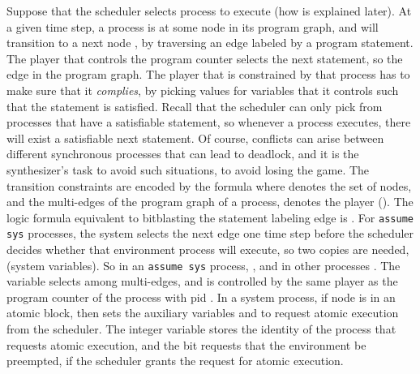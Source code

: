 \documentclass[copyright]{eptcs}
\begin{document}
Suppose that the scheduler selects process  to execute (how is explained later).
At a given time step, a process is at some node  in its program graph, and will transition to a next node , by traversing an edge labeled by a program statement.
The player that controls the program counter  selects the next statement, so the edge in the program graph.
The player that is constrained by that process has to make sure that it {\em complies}, by picking values for variables that it controls such that the statement is satisfied.
Recall that the scheduler can only pick from processes that have a satisfiable statement, so whenever a process executes, there will exist a satisfiable next statement.
Of course, conflicts can arise between different synchronous processes that can lead to deadlock, and it is the synthesizer's task to avoid such situations, to avoid losing the game.
The transition constraints are encoded by the formula
where  denotes the set of nodes, and  the multi-edges of the program graph of a process,  denotes the player ().
The logic formula equivalent to bitblasting the statement labeling edge  is .
For \texttt{assume sys} processes, the system selects the next edge one time step before the scheduler decides whether that environment process will execute, so two copies are needed,  (system variables).
So in an \texttt{assume sys} process,
, and in other processes
.
The variable  selects among multi-edges, and is controlled by the same player as the program counter  of the process with pid .
In a system process, if node  is in an atomic block, then  sets the auxiliary variables  and  to request atomic execution from the scheduler.
The integer variable  stores the identity of the process that requests atomic execution, and the bit  requests that the environment be preempted, if the scheduler grants the request for atomic execution.
\end{document}
